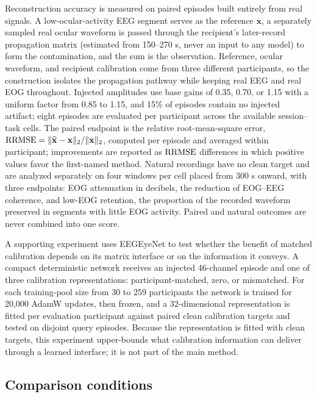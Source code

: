 Reconstruction accuracy is measured on paired episodes built entirely from real signals. A low-ocular-activity EEG segment serves as the reference $\mathbf{x}$, a separately sampled real ocular waveform is passed through the recipient's later-record propagation matrix (estimated from 150--270 s, never an input to any model) to form the contamination, and the sum is the observation. Reference, ocular waveform, and recipient calibration come from three different participants, so the construction isolates the propagation pathway while keeping real EEG and real EOG throughout. Injected amplitudes use base gains of 0.35, 0.70, or 1.15 with a uniform factor from 0.85 to 1.15, and 15\% of episodes contain no injected artifact; eight episodes are evaluated per participant across the available session--task cells. The paired endpoint is the relative root-mean-square error, $\mathrm{RRMSE} = \lVert \widehat{\mathbf{x}} - \mathbf{x} \rVert_2 / \lVert \mathbf{x} \rVert_2$, computed per episode and averaged within participant; improvements are reported as $\mathrm{RRMSE}$ differences in which positive values favor the first-named method. Natural recordings have no clean target and are analyzed separately on four windows per cell placed from 300 s onward, with three endpoints: EOG attenuation in decibels, the reduction of EOG--EEG coherence, and low-EOG retention, the proportion of the recorded waveform preserved in segments with little EOG activity. Paired and natural outcomes are never combined into one score.

A supporting experiment uses EEGEyeNet \cite{kastrati2021eegeyenet} to test whether the benefit of matched calibration depends on its matrix interface or on the information it conveys. A compact deterministic network receives an injected 46-channel episode and one of three calibration representations: participant-matched, zero, or mismatched. For each training-pool size from 30 to 259 participants the network is trained for 20{,}000 AdamW updates, then frozen, and a 32-dimensional representation is fitted per evaluation participant against paired clean calibration targets and tested on disjoint query episodes. Because the representation is fitted with clean targets, this experiment upper-bounds what calibration information can deliver through a learned interface; it is not part of the main method.

\subsection{Comparison conditions}
\label{sec:exp-comparisons}

